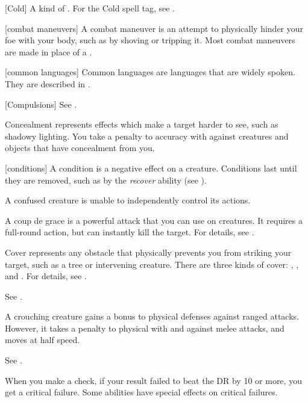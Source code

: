 [Cold] A kind of . For the Cold spell tag, see .

[combat maneuvers] A combat maneuver is an attempt to physically hinder your foe with your body, such as by shoving or tripping it.
Most combat maneuvers are made in place of a .

[common languages] Common languages are languages that are widely spoken.
They are described in .

[Compulsions] See .

 Concealment represents effects which make a target harder to see, such as shadowy lighting.
You take a  penalty to accuracy with  against creatures and objects that have concealment from you.

[conditions] A condition is a negative effect on a creature.
Conditions last until they are removed, such as by the \textit{recover} ability (see ).

 A confused creature is unable to independently control its actions. \confusionexplanation

 A coup de grace is a powerful attack that you can use on \helpless creatures.
It requires a full-round action, but can instantly kill the target.
For details, see .

 Cover represents any obstacle that physically prevents you from striking your target, such as a tree or intervening creature.
There are three kinds of cover: , , and .
For details, see .

 See .

 A crouching creature gains a  bonus to physical defenses against ranged attacks.
However, it takes a  penalty to physical  with  and  against melee attacks, and moves at half speed.

 See .

 When you make a check, if your result failed to beat the DR by 10 or more, you get a critical failure.
Some abilities have special effects on critical failures.


